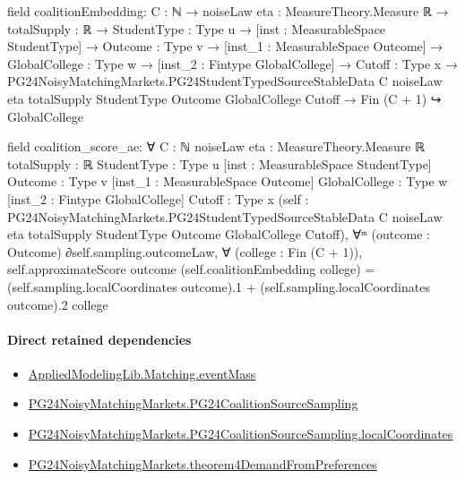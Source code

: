 \documentclass[10pt]{article}
\begin{document}
\begin{ReviewVerbatim}
field coalitionEmbedding:
{C : ℕ} →
  {noiseLaw eta : MeasureTheory.Measure ℝ} →
    {totalSupply : ℝ} →
      {StudentType : Type u} →
        [inst : MeasurableSpace StudentType] →
          {Outcome : Type v} →
            [inst_1 : MeasurableSpace Outcome] →
              {GlobalCollege : Type w} →
                [inst_2 : Fintype GlobalCollege] →
                  {Cutoff : Type x} →
                    PG24NoisyMatchingMarkets.PG24StudentTypedSourceStableData C noiseLaw eta totalSupply StudentType
                        Outcome GlobalCollege Cutoff →
                      Fin (C + 1) ↪ GlobalCollege

field coalition_score_ae:
∀ {C : ℕ} {noiseLaw eta : MeasureTheory.Measure ℝ} {totalSupply : ℝ} {StudentType : Type u}
  [inst : MeasurableSpace StudentType] {Outcome : Type v} [inst_1 : MeasurableSpace Outcome] {GlobalCollege : Type w}
  [inst_2 : Fintype GlobalCollege] {Cutoff : Type x}
  (self :
    PG24NoisyMatchingMarkets.PG24StudentTypedSourceStableData C noiseLaw eta totalSupply StudentType Outcome
      GlobalCollege Cutoff),
  ∀ᵐ (outcome : Outcome) ∂self.sampling.outcomeLaw,
    ∀ (college : Fin (C + 1)),
      self.approximateScore outcome (self.coalitionEmbedding college) =
        (self.sampling.localCoordinates outcome).1 + (self.sampling.localCoordinates outcome).2 college
\end{ReviewVerbatim}

\paragraph{Direct retained dependencies}
\begin{itemize}\raggedright
\item \hyperlink{governing-declaration-ca98cd4cb31ef73e}{Applied\allowbreak{}Modeling\allowbreak{}Lib.\allowbreak{}Matching.\allowbreak{}event\allowbreak{}Mass}
\item \hyperlink{paper-prerequisite-ff3f13051cdbc914}{PG24\allowbreak{}Noisy\allowbreak{}Matching\allowbreak{}Markets.\allowbreak{}PG24\allowbreak{}Coalition\allowbreak{}Source\allowbreak{}Sampling}
\item \hyperlink{governing-declaration-05b0ef210995642f}{PG24\allowbreak{}Noisy\allowbreak{}Matching\allowbreak{}Markets.\allowbreak{}PG24\allowbreak{}Coalition\allowbreak{}Source\allowbreak{}Sampling.\allowbreak{}local\allowbreak{}Coordinates}
\item \hyperlink{governing-declaration-1730d456ca2f5e34}{PG24\allowbreak{}Noisy\allowbreak{}Matching\allowbreak{}Markets.\allowbreak{}theorem4\allowbreak{}Demand\allowbreak{}From\allowbreak{}Preferences}
\end{itemize}
\hypertarget{governing-declaration-20c04cd0b5347ec4}{}
\end{document}
